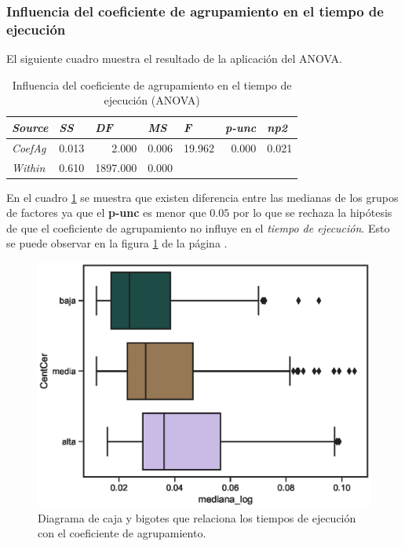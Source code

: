 \documentclass{article}
\begin{document}
\subsubsection{Influencia del coeficiente de agrupamiento en el tiempo de ejecución}
El siguiente cuadro muestra el resultado de la aplicación del ANOVA.

\begin{table}[htbp]
  \centering
  \caption{Influencia del coeficiente de agrupamiento en el tiempo de ejecución (ANOVA)}
    \begin{tabular}{lrrrrrr}
    \toprule
    \textit{\textbf{Source}} & \multicolumn{1}{l}{\textit{\textbf{SS}}} & \multicolumn{1}{l}{\textit{\textbf{DF}}} & \multicolumn{1}{l}{\textit{\textbf{MS}}} & \multicolumn{1}{l}{\textit{\textbf{F}}} & \multicolumn{1}{l}{\textit{\textbf{p-unc}}} & \multicolumn{1}{l}{\textit{\textbf{np2}}} \\
    \midrule
    \textit{CoefAg} & 0.013 & 2.000 & 0.006 & 19.962 & 0.000 & 0.021 \\
    \textit{Within} & 0.610 & 1897.000 & 0.000 &       &       &  \\
    \bottomrule
    \end{tabular}%
  \label{tab:t5}%
\end{table}%

En el cuadro \ref{tab:t5} se muestra que existen diferencia entre las medianas de los grupos de factores ya que el {\bf p-unc} es menor que $0.05$ por lo que se rechaza la hipótesis de que el coeficiente de agrupamiento no influye en el \textit{tiempo de ejecución}. Esto se puede observar en la figura \ref{fig14} de la página \pageref{fig14}. 

\begin{center}
\begin{figure}[htbp]
\includegraphics[scale=0.6]{boxplot_CentCer.eps}
\caption{Diagrama de caja y bigotes que relaciona los tiempos de ejecución con el coeficiente de agrupamiento.}
\label{fig14}
\end{figure}
\end{center}
\end{document}
